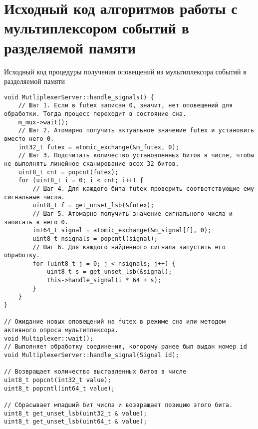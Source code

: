 \chapter{Исходный код алгоритмов работы с мультиплексором событий в разделяемой памяти}\label{sec:app:1}

\begin{algorithm}[!h]
\caption{Исходный код процедуры получения оповещений из мультиплексора событий в разделяемой памяти}
\label{appendix91:ReceiverCode}
\begin{lstlisting}[frame=tlrb]
void MutliplexerServer::handle_signals() {
	// Шаг 1. Если в futex записан 0, значит, нет оповещений для обработки. Тогда процесс переходит в состояние сна.
	m_mux->wait();
	// Шаг 2. Атомарно получить актуальное значение futex и установить вместо него 0.
	int32_t futex = atomic_exchange(&m_futex, 0);
	// Шаг 3. Подсчитать количество установленных битов в числе, чтобы не выполнять линейное сканирование всех 32 битов.
	uint8_t cnt = popcnt(futex);
	for (uint8_t i = 0; i < cnt; i++) {
		// Шаг 4. Для каждого бита futex проверить соответствующие ему сигнальные числа.
		uint8_t f = get_unset_lsb(&futex);
		// Шаг 5. Атомарно получить значение сигнального числа и записать в него 0.
		int64_t signal = atomic_exchange(&m_signal[f], 0);
		uint8_t nsignals = popcntl(signal);
		// Шаг 6. Для каждого найденного сигнала запустить его обработку.
		for (uint8_t j = 0; j < nsignals; j++) {
			uint8_t s = get_unset_lsb(&signal);
			this->handle_signal(i * 64 + s);
		}
	}
}

// Ожидание новых оповещений на futex в режиме сна или методом активного опроса мультиплексора.
void Multiplexer::wait();
// Выполняет обработку соединения, которому ранее был выдан номер id
void MultiplexerServer::handle_signal(Signal id);

// Возвращает количество выставленных битов в числе
uint8_t popcnt(int32_t value);
uint8_t popcntl(int64_t value);

// Сбрасывает младший бит числа и возвращает позицию этого бита.
uint8_t get_unset_lsb(uint32_t & value);
uint8_t get_unset_lsb(uint64_t & value);
\end{lstlisting}
\end{algorithm}

